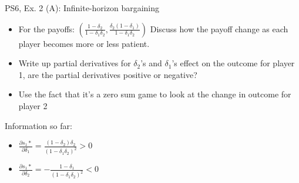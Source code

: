 \begin{frame}{PS6, Ex. 2 (A): Infinite-horizon bargaining}
    \begin{itemize}
    \item[Part one:] For the payoffs: $ \left( \frac{1-\delta_2}{1-\delta_1\delta_2},\frac{\delta_2(1-\delta_1)}{1-\delta_1\delta_2}\right)$ Discuss how the payoff change as each player becomes more or less patient.
    \end{itemize}
    \vfill\null
  \begin{multicols}{2}
    \begin{itemize}
      \item[(Step a)] Write up partial derivatives for $\delta_2$'s and $\delta_1$'s effect on the outcome for player 1, are the partial derivatives positive or negative?
      \item[(Step b)] Use the fact that it's a zero sum game to look at the change in outcome for player 2
      \end{itemize}
    \vfill\null \columnbreak
    Information so far:
    \begin{itemize}
    \item[1] $\frac{\partial s_1*}{\partial \delta_1} = \frac{(1-\delta_2)\delta_2}{(1-\delta_1\delta_2)^2}>0 $\\
    \item[2] $\frac{\partial s_1*}{\partial \delta_2} = -\frac{1-\delta_1}{(1-\delta_1\delta_2)^2}<0 $\\
    \end{itemize}
    \vfill\null
  \end{multicols}
 \vfill\null
\end{frame}

